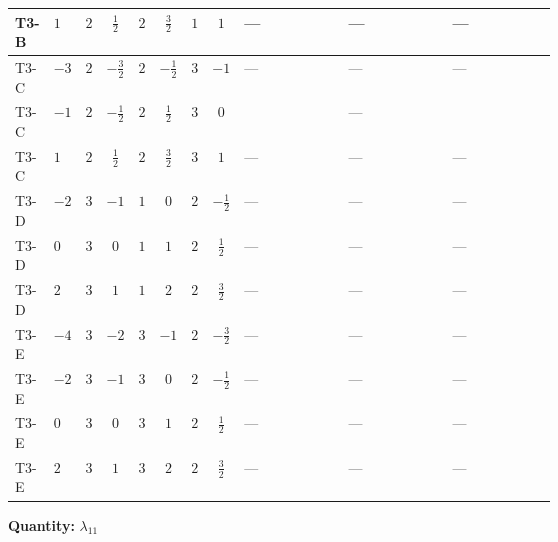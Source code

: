 \documentclass[8pt]{article}
\begin{document}
\begin{landscape}
\begin{longtable}{@{}llcccccc >{\raggedright\arraybackslash}p{0.21\linewidth} >{\raggedright\arraybackslash}p{0.21\linewidth} >{\raggedright\arraybackslash}p{0.21\linewidth}@{}}
\midrule
T3-B & $1$ & $2$ & $\frac{1}{2}$ & $2$ & $\frac{3}{2}$ & $1$ & $1$ & --- & --- & --- \\
\midrule
T3-C & $-3$ & $2$ & $-\frac{3}{2}$ & $2$ & $-\frac{1}{2}$ & $3$ & $-1$ & --- & --- & --- \\
\midrule
T3-C & $-1$ & $2$ & $-\frac{1}{2}$ & $2$ & $\frac{1}{2}$ & $3$ & $0$ & \scriptsize\adjustbox{max width=\linewidth}{$\begin{gathered} +{\lambda_{9}} (3 \operatorname{Tr}\!\left({y_1}\,\left({y_2}\right)^{\dagger}\right)+4 (\left({\lambda_{10}}\right)^{*}+5 \left({\lambda_{11}}\right)^{*}))\end{gathered}$} & --- & \scriptsize\adjustbox{max width=\linewidth}{$\begin{gathered} -5 \operatorname{Tr}\!\left({y_1}\,\left({y_1}\right)^{\dagger}\,{y_2}\,\left({y_1}\right)^{\dagger}\right)\end{gathered}$} \\
\midrule
T3-C & $1$ & $2$ & $\frac{1}{2}$ & $2$ & $\frac{3}{2}$ & $3$ & $1$ & --- & --- & --- \\
\midrule
T3-D & $-2$ & $3$ & $-1$ & $1$ & $0$ & $2$ & $-\frac{1}{2}$ & --- & --- & --- \\
\midrule
T3-D & $0$ & $3$ & $0$ & $1$ & $1$ & $2$ & $\frac{1}{2}$ & --- & --- & --- \\
\midrule
T3-D & $2$ & $3$ & $1$ & $1$ & $2$ & $2$ & $\frac{3}{2}$ & --- & --- & --- \\
\midrule
T3-E & $-4$ & $3$ & $-2$ & $3$ & $-1$ & $2$ & $-\frac{3}{2}$ & --- & --- & --- \\
\midrule
T3-E & $-2$ & $3$ & $-1$ & $3$ & $0$ & $2$ & $-\frac{1}{2}$ & --- & --- & --- \\
\midrule
T3-E & $0$ & $3$ & $0$ & $3$ & $1$ & $2$ & $\frac{1}{2}$ & --- & --- & --- \\
\midrule
T3-E & $2$ & $3$ & $1$ & $3$ & $2$ & $2$ & $\frac{3}{2}$ & --- & --- & --- \\
\midrule
\bottomrule
\end{longtable}
\clearpage
\noindent\textbf{Quantity: }$\lambda_{11}$\par\smallskip

\end{landscape}
\end{document}
